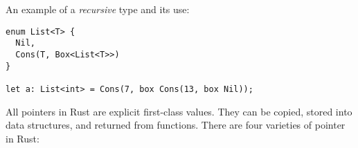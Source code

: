 \documentclass[]{article}
\begin{document}
An example of a \emph{recursive} type and its use:

\begin{verbatim}
enum List<T> {
  Nil,
  Cons(T, Box<List<T>>)
}

let a: List<int> = Cons(7, box Cons(13, box Nil));
\end{verbatim}


All pointers in Rust are explicit first-class values. They can be
copied, stored into data structures, and returned from functions. There
are four varieties of pointer in Rust:
\end{document}
